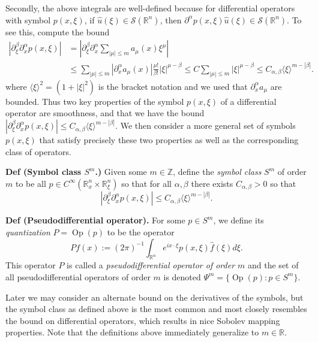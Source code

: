 \documentclass[
]{article}
\begin{document}
Secondly, the above integrals are well-defined because for differential
operators with symbol \(p(x, \xi)\), if
\(\hat{u}(\xi) \in \mathscr{S}(\mathbb{R}^n)\), then
\(\partial^{\alpha}p(x,\xi) \hat{u}(\xi) \in \mathscr{S}(\mathbb{R}^n)\).
To see this, compute the bound \begin{align}
    |\partial_{\xi}^{\beta} \partial_{x}^{\alpha} p(x,\xi)|
    &= \left|\partial_{\xi}^{\beta} \partial_{x}^{\alpha} \sum_{|\mu| \leq m} a_{\mu}(x)\xi^{\mu}\right|\\\
    &\leq \sum_{|\mu| \leq m} |\partial_x^{\alpha}a_{\mu}(x)|\frac{\mu!}{\beta!}|\xi|^{\mu-\beta}
    \leq C\sum_{|\mu| \leq m}|\xi|^{\mu - \beta}
    \leq C_{\alpha, \beta} \langle \xi \rangle^{m - |\beta|}.
\end{align} where \(\langle \xi \rangle^2 = (1+|\xi|^2)\) is the bracket
notation and we used that \(\partial_x^{\alpha}a_{\mu}\) are bounded.
Thus two key properties of the symbol \(p(x,\xi)\) of a differential
operator are smoothness, and that we have the bound
\(|\partial_{\xi}^{\beta} \partial_{x}^{\alpha} p(x,\xi)| \leq C_{\alpha, \beta} \langle \xi \rangle^{m - |\beta|}\).
We then consider a more general set of symbols \(p(x, \xi)\) that
satisfy precisely these two properties as well as the corresponding
class of operators.

\textbf{Def (Symbol class \(S^m\).)} Given some \(m \in \mathbb{Z}\),
define the \emph{symbol class} \(S^m\) of order \(m\) to be all
\(p \in C^{\infty}(\mathbb{R}_x^{n} \times \mathbb{R}^n_{\xi})\) so that
for all \(\alpha, \beta\) there exists \(C_{\alpha, \beta} > 0\) so that
\[
    |\partial_{\xi}^{\beta}\partial_{x}^{\alpha}p(x, \xi)| \leq C_{\alpha, \beta}\langle \xi \rangle^{m-|\beta|}.
\]

\textbf{Def (Pseudodifferential operator).} For some \(p \in S^m\), we
define its \emph{quantization} \(P = \operatorname{Op}(p)\) to be the
operator \[
    Pf(x) := (2\pi)^{-1}\int_{\mathbb{R}^n} e^{ix \cdot \xi} p(x, \xi) \hat{f}(\xi)d\xi.
\] This operator \(P\) is called a \emph{pseudodifferential operator of
order \(m\)} and the set of all pseudodifferential operators of order
\(m\) is denoted \(\Psi^m = \{\operatorname{Op}(p): p \in S^m\}.\)

Later we may consider an alternate bound on the derivatives of the
symbols, but the symbol class as defined above is the most common and
most closely resembles the bound on differential operators, which
results in nice Sobolev mapping properties. Note that the definitions
above immediately generalize to \(m \in \mathbb{R}\).
\end{document}
